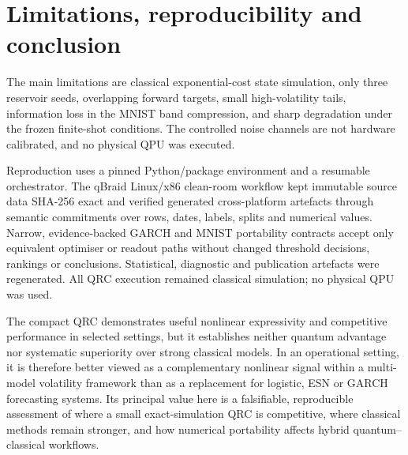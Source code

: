 \documentclass[11pt,a4paper]{article}
\begin{document}
\section{Limitations, reproducibility and conclusion}

The main limitations are classical exponential-cost state simulation, only
three reservoir seeds, overlapping forward targets, small high-volatility
tails, information loss in the MNIST band compression, and sharp degradation
under the frozen finite-shot conditions. The controlled noise channels are not
hardware calibrated, and no physical QPU was executed.

Reproduction uses a pinned Python/package environment and a resumable
orchestrator. The qBraid Linux/x86 clean-room workflow kept immutable source
data SHA-256 exact and verified generated cross-platform artefacts through
semantic commitments over rows, dates, labels, splits and numerical values.
Narrow, evidence-backed GARCH and MNIST portability contracts accept only
equivalent optimiser or readout paths without changed threshold decisions,
rankings or conclusions. Statistical, diagnostic and publication artefacts
were regenerated. All QRC execution remained classical simulation; no
physical QPU was used.

The compact QRC demonstrates useful nonlinear expressivity and competitive
performance in selected settings, but it establishes neither quantum advantage
nor systematic superiority over strong classical models. In an operational
setting, it is therefore better viewed as a complementary nonlinear signal
within a multi-model volatility framework than as a replacement for logistic,
ESN or GARCH forecasting systems. Its principal value here is a falsifiable,
reproducible assessment of where a small exact-simulation QRC is competitive,
where classical methods remain stronger, and how numerical portability affects
hybrid quantum--classical workflows.

\begingroup
\small
\setlength{\parskip}{0pt}


\endgroup
\end{document}
